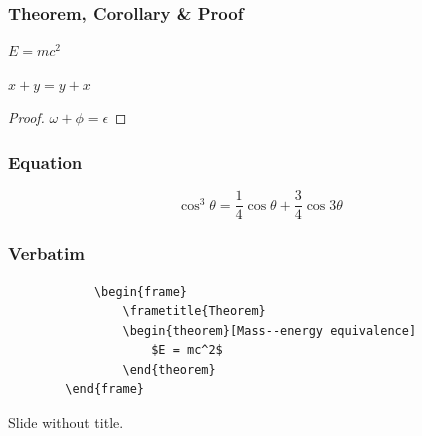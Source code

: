 \documentclass[
	12pt, %
]{beamer}
\begin{document}

\begin{frame}
	\frametitle{Theorem, Corollary \& Proof}
	
	\begin{theorem}
		$E = mc^2$
	\end{theorem}
	
	\begin{corollary}
		$x + y = y + x$
	\end{corollary}
	
	\begin{proof}
		$\omega + \phi = \epsilon$
	\end{proof}
\end{frame}


\begin{frame}
	\frametitle{Equation}

	\begin{equation}
		\cos^3 \theta =\frac{1}{4}\cos\theta+\frac{3}{4}\cos 3\theta
	\end{equation}
\end{frame}


\begin{frame}[fragile] %
	\frametitle{Verbatim}
	
	\begin{example}
		\begin{verbatim}
			\begin{frame}
				\frametitle{Theorem}
				\begin{theorem}[Mass--energy equivalence]
					$E = mc^2$
				\end{theorem}
		\end{frame}\end{verbatim} %
	\end{example}
\end{frame}


\begin{frame}
	Slide without title.
\end{frame}

\end{document}
